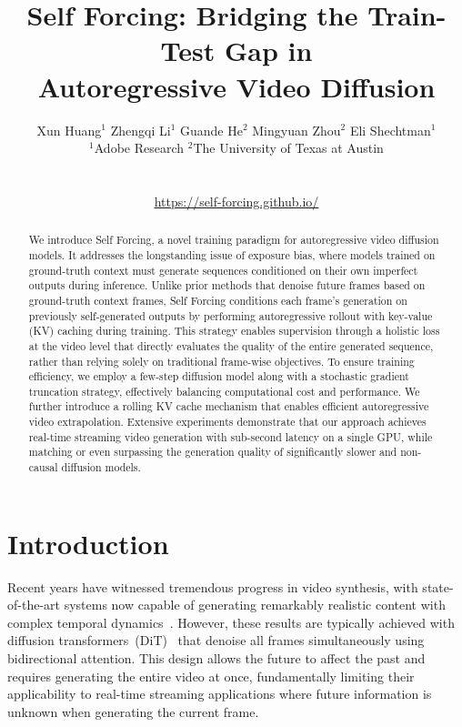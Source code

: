 \documentclass{article}
\title{Self Forcing: Bridging the Train-Test Gap in \\ Autoregressive Video Diffusion}
\author{%
Xun Huang$^1$ \quad Zhengqi Li$^1$ \quad Guande He$^2$ \quad Mingyuan Zhou$^2$ \quad Eli Shechtman$^1$ \\
$^1$Adobe Research \quad $^2$The University of Texas at Austin\\\\
\centerline{\url{https://self-forcing.github.io/}}
}
\begin{document}
\maketitle


\vspace{-1em}
\begin{abstract}
  We introduce Self Forcing, a novel training paradigm for autoregressive video diffusion models. It addresses the longstanding issue of exposure bias, where models trained on ground-truth context must generate sequences conditioned on their own imperfect outputs during inference. Unlike prior methods that denoise future frames based on ground-truth context frames, Self Forcing conditions each frame’s generation on previously self-generated outputs by performing autoregressive rollout with key-value (KV) caching during training. This strategy enables supervision through a holistic loss at the video level that directly evaluates the quality of the entire generated sequence, rather than relying solely on traditional frame-wise objectives. To ensure training efficiency, we employ a few-step diffusion model along with a stochastic gradient truncation strategy, effectively balancing computational cost and performance. We further introduce a rolling KV cache mechanism that enables efficient autoregressive video extrapolation. Extensive experiments demonstrate that our approach achieves real-time streaming video generation with sub-second latency on a single GPU, while matching or even surpassing the generation quality of significantly slower and non-causal diffusion models.  
\end{abstract}


\section{Introduction}
Recent years have witnessed tremendous progress in video synthesis, with state-of-the-art systems now capable of generating remarkably realistic content with complex temporal dynamics~\cite{videoworldsimulators2024}.
However, these results are typically achieved with diffusion transformers~(DiT)~\cite{peebles2022scalable,wang2025wan} that denoise all frames simultaneously using bidirectional attention. This design allows the future to affect the past and requires generating the entire video at once, fundamentally limiting their applicability to real-time streaming applications where future information is unknown when generating the current frame.
\end{document}
